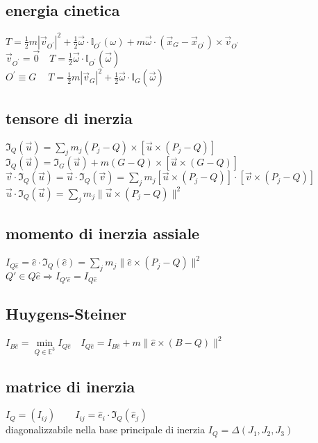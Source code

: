 \documentclass[10pt,a4paper,landscape]{article}
\begin{document}
\begin{multicols}{3}
	\subsection{energia cinetica}
	$T=\frac1 2 m |\vec v_{O^\prime}|^2+\frac1 2 \vec \omega \cdot \mathbb{I}_{O^\prime}(\omega)+m\vec \omega \cdot (\vec x_G-\vec x_{O^\prime})\times \vec v_{O^\prime}$\\
	$\vec v_{O^\prime}\!=\vec 0\quad T=\frac 1 2 \vec \omega \cdot \mathbb{I}_{O^\prime}(\vec\omega)$\\
	$O^{\prime}\!\equiv\!G\quad\:T=\frac1 2 m |\vec v_G|^2+\frac1 2\vec \omega \cdot \mathbb{I}_G(\vec\omega)$\\

	\subsection{tensore di inerzia}
	$\mathfrak{I}_Q(\vec u)=\sum_j m_j(P_j-Q)\times[\vec u \times (P_j-Q)]$\\
	$\mathfrak{I}_Q(\vec u)=\mathfrak{I}_G(\vec u)+m(G-Q)\times[\vec u \times (G-Q)]$\\
	$\vec v\cdot\mathfrak{I}_Q(\vec u)=\vec u\cdot\mathfrak{I}_Q(\vec v)=\sum_j m_j[\vec u \times (P_j-Q)]\cdot[\vec v \times (P_j-Q)]$\\
	$\vec u\cdot\mathfrak{I}_Q(\vec u)=\sum_j m_j\|\vec u \times (P_j-Q)\|^2$\\

	\subsection{momento di inerzia assiale}
	$I_{Q\hat e}=\hat e \cdot \mathfrak{I}_Q(\hat e)=\sum_j m_j\|\hat e \times (P_j-Q)\|^2$\\
	$Q'\in Q\hat e \Longrightarrow I_{Q'\hat e}=I_{Q\hat e}$\\

	\subsection{Huygens-Steiner}
	$I_{B\hat e}=\underset{Q\in \mathbb{E}^3}{\min}I_{Q\hat e}\quad I_{Q\hat e}=I_{B\hat e}+m\|\hat e \times (B-Q)\|^2$\\

	\subsection{matrice di inerzia}
	$I_Q=(I_{ij})\qquad I_{ij}=\hat e_i \cdot \mathfrak{I}_Q(\hat e_j)$\\
	diagonalizzabile nella base principale di inerzia $I_Q=\Delta(J_1,J_2,J_3)$\\


\end{multicols}
\end{document}
